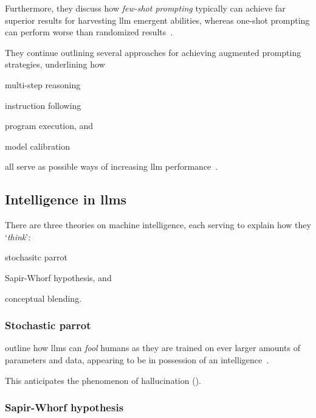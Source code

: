 Furthermore, they discuss how \textit{few-shot prompting} typically can achieve
far superior results for harvesting \acrshort{llm} emergent abilities, whereas
one-shot prompting can perform worse than randomized
results~\cite[3-4]{emergentabilitiesLLM}.

They continue outlining several approaches for achieving augmented prompting
strategies, underlining how \begin{inparaenum}
    \item multi-step reasoning
    \item instruction following
    \item program execution,
    and
    \item model calibration
\end{inparaenum}
all serve as possible ways of increasing \acrshort{llm} performance~\cite[5]{emergentabilitiesLLM}.


\subsection{Intelligence in \acrshort{llms}}\label{sec:llmIntelligence}

There are three theories on machine intelligence, each serving to
explain how they `\textit{think}': \begin{inparaenum}
    \item stochasitc parrot
    \item Sapir-Whorf hypothesis,
    and
    \item conceptual blending.
\end{inparaenum}

\subsubsection{Stochastic parrot}\label{sec:llmParrot}

\citeauthor{parrot} outline how \acrshort{llms} can \textit{fool} humans as they
are trained on ever larger amounts of parameters and data, appearing to be in possession of an
intelligence~\cite[610-611]{parrot}.

This anticipates the phenomenon of hallucination ().

\subsubsection{Sapir-Whorf hypothesis}

